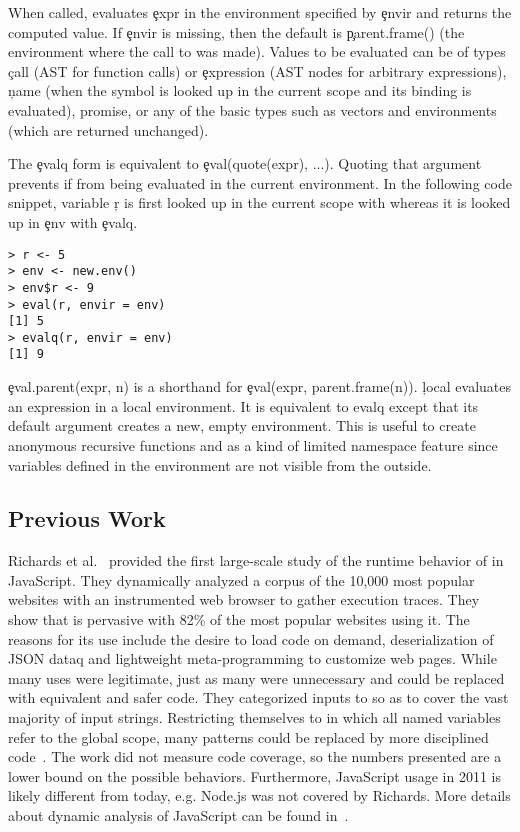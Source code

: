 \documentclass[USenglish,cleveref, autoref, thm-restate]{lipics-v2019}
\begin{document}
When called, \eval evaluates \c{expr} in the environment specified by
\c{envir} and returns the computed value. If \c{envir} is missing, then the
default is \c{parent.frame()} (the environment where the call to \eval was
made).  Values to be evaluated can be of types \c{call} (AST for function
calls) or \c{expression} (AST nodes for arbitrary expressions), \c{name}
(when the symbol is looked up in the current scope and its binding is
evaluated), promise, or any of the basic types such as vectors and
environments (which are returned unchanged).

The \c{evalq} form is equivalent to \c{eval(quote(expr), ...)}.  Quoting
that argument prevents if from being evaluated in the current environment.
In the following code snippet, variable \c{r} is first looked up in
the current scope with \eval whereas it is looked up in \c{env} with
\c{evalq}.

\begin{lstlisting}
> r <- 5
> env <- new.env()
> env$r <- 9
> eval(r, envir = env)
[1] 5
> evalq(r, envir = env)
[1] 9
\end{lstlisting}

\c{eval.parent(expr, n)} is a shorthand for \c{eval(expr, parent.frame(n))}.
\c{local} evaluates an expression in a local environment. It is equivalent
to evalq except that its default argument creates a new, empty
environment. This is useful to create anonymous recursive functions and as a
kind of limited namespace feature since variables defined in the environment
are not visible from the outside.



\subsection{Previous Work}

Richards et al.~\cite{ecoop11} provided the first large-scale study of
the runtime behavior of \eval in JavaScript. They dynamically analyzed
a corpus of the 10,000 most popular websites with an instrumented web
browser to gather execution traces.  They show that \eval is pervasive
with 82\% of the most popular websites using it. The reasons for its
use include the desire to load code on demand, deserialization of JSON
dataq and lightweight meta-programming to customize web pages.  While
many uses were legitimate, just as many were unnecessary and could be
replaced with equivalent and safer code.  They categorized inputs to
\eval so as to cover the vast majority of input strings.  Restricting
themselves to \eval in which all named variables refer to the global
scope, many patterns could be replaced by more disciplined
code~\cite{oopsla12b}.  The work did not measure code coverage, so the
numbers presented are a lower bound on the possible behaviors.
Furthermore, JavaScript usage in 2011 is likely different from today,
e.g. Node.js was not covered by Richards.  More details about dynamic
analysis of JavaScript can be found in~\cite{liang}.
\end{document}
